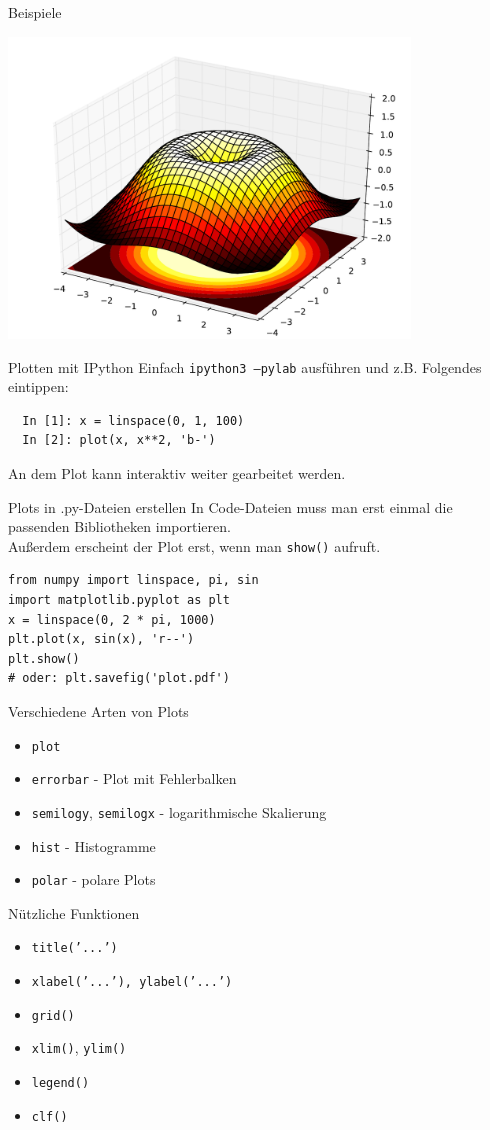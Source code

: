 \begin{frame}{Beispiele}
  \begin{center}
    \includegraphics[width=0.8\textwidth]{img/matplotlib/mplot3d.pdf}
  \end{center}
\end{frame}

\begin{frame}[fragile]{Plotten mit IPython}
  Einfach \texttt{ipython3 --pylab} ausführen und z.B. Folgendes eintippen:
\begin{verbatim}
  In [1]: x = linspace(0, 1, 100)
  In [2]: plot(x, x**2, 'b-')
\end{verbatim}
  An dem Plot kann interaktiv weiter gearbeitet werden.
\end{frame}

\begin{frame}[fragile]{Plots in .py-Dateien erstellen}
  In Code-Dateien muss man erst einmal die passenden Bibliotheken importieren.\\
  Außerdem erscheint der Plot erst, wenn man \verb|show()| aufruft.
\begin{verbatim}
from numpy import linspace, pi, sin
import matplotlib.pyplot as plt
x = linspace(0, 2 * pi, 1000)
plt.plot(x, sin(x), 'r--')
plt.show()
# oder: plt.savefig('plot.pdf')
\end{verbatim}
\end{frame}

\begin{frame}{Verschiedene Arten von Plots}
  \begin{itemize}
    \item \texttt{plot}
    \item \texttt{errorbar} - Plot mit Fehlerbalken
    \item \texttt{semilogy}, \texttt{semilogx} - logarithmische Skalierung
    \item \texttt{hist} - Histogramme
    \item \texttt{polar} - polare Plots
  \end{itemize}
\end{frame}

\begin{frame}{Nützliche Funktionen}
  \begin{itemize}
    \item \texttt{title('...')}
    \item \texttt{xlabel('...'), ylabel('...')}
    \item \texttt{grid()}
    \item \texttt{xlim()}, \texttt{ylim()}
    \item \texttt{legend()}
    \item \texttt{clf()}
  \end{itemize}
\end{frame}

